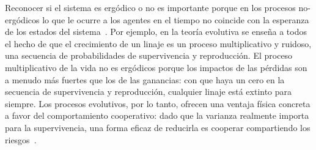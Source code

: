 \documentclass[a4paper,10pt]{book}
\begin{document}

Reconocer si el sistema es ergódico o no es importante porque en los procesos no-ergódicos lo que le ocurre a los agentes en el tiempo no coincide con la esperanza de los estados del sistema~\cite{peters2019-ergodicityEconomics}.
%
Por ejemplo, en la teoría evolutiva se enseña a todos el hecho de que el crecimiento de un linaje es un proceso multiplicativo y ruidoso, una secuencia de probabilidades de supervivencia y reproducción.
%
El proceso multiplicativo de la vida no es ergódicos porque los impactos de las pérdidas son a menudo más fuertes que los de las ganancias: con que haya un cero en la secuencia de supervivencia y reproducción, cualquier linaje está extinto para siempre.
%
Los procesos evolutivos, por lo tanto, ofrecen una ventaja física concreta a favor del comportamiento cooperativo: dado que la varianza realmente importa para la supervivencia, una forma eficaz de reducirla es cooperar compartiendo los riesgos~\cite{yaari2010-cooperationEvolution,peters2015-evolutionaryAdvantageOfCooperation}.

\end{document}
